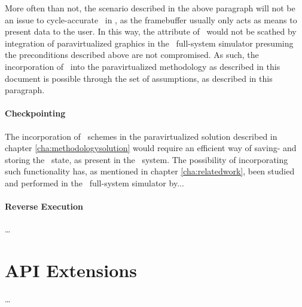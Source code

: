 \noindent
More often than not, the scenario described in the above paragraph will not be an issue to cycle-accurate \dvttermdeterministicexecution\ in \dvttermsimics , as the framebuffer usually only acts as means to present data to the user.
In this way, the attribute of \dvttermdeterministicexecution\ would not be scathed by integration of paravirtualized graphics in the \dvttermsimics\ full-system simulator presuming the preconditions described above are not compromised.
As such, the incorporation of \dvttermdeterministicexecution\ into the paravirtualized methodology as described in this document is possible through the set of assumptions, as described in this paragraph.

\paragraph{Checkpointing}
\label{par:futurework_simicsproductification_checkpointing}
The incorporation of \dvttermcheckpointrestart\ schemes in the paravirtualized solution described in chapter \ref{cha:methodologysolution} would require an efficient way of saving- and storing the \dvttermopengl\ state, as present in the \dvttermhost\ system.
The possibility of incorporating such functionality has, as mentioned in chapter \ref{cha:relatedwork}, been studied and performed in the \dvttermqemu\ full-system simulator by...

\paragraph{Reverse Execution}
\label{par:futurework_simicsproductification_reverseexecution}
\ldots

\section{API Extensions}
\label{sec:futurework_apiextensions}
\ldots



